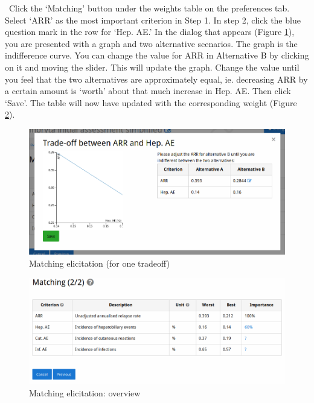 \documentclass[00_mcda_tutorial.tex]{subfiles}
\begin{document}
\noindent \leftpointright \, Click the ‘Matching’ button under the weights table on the preferences tab. Select ‘ARR’ as the most important criterion in Step 1. In step 2, click the blue question mark in the row for ‘Hep. AE.’ In the dialog that appears (Figure \ref{fig:matching1}), you are presented with a graph and two alternative scenarios. The graph is the indifference curve. You can change the value for ARR in Alternative B by clicking on it and moving the slider. This will update the graph. Change the value until you feel that the two alternatives are approximately equal, ie. decreasing ARR by a certain amount is ‘worth’ about that much increase in Hep. AE. Then click ‘Save’. The table will now have updated with the corresponding weight (Figure \ref{fig:matching2}).
\newline

\begin{figure}[!h]
    \centering
	\includegraphics[width=\textwidth]{fig/matching1.png}
    \caption{Matching elicitation (for one tradeoff)}
	\label{fig:matching1}
\end{figure}

\begin{figure}[!h]
    \centering
	\includegraphics[width=\textwidth]{fig/matching2.png}
    \caption{Matching elicitation: overview}
	\label{fig:matching2}
\end{figure}
\end{document}
